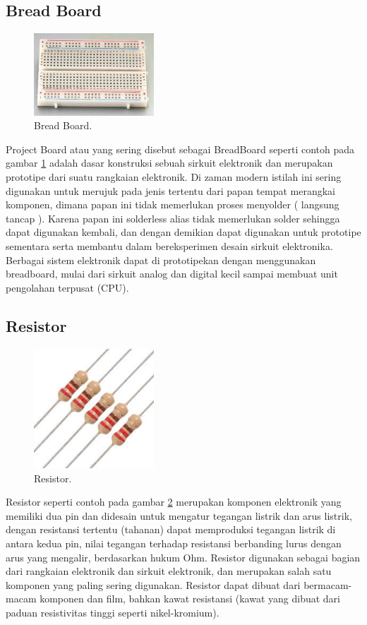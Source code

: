 \subsection{Bread Board}
\begin{figure}[ht]
\centerline{\includegraphics[width=0.4\textwidth]{figures/breadboard.jpg}}
\caption{Bread Board.}
\label{breadboard}
\end{figure}
Project Board atau yang sering disebut sebagai BreadBoard seperti contoh pada gambar \ref{breadboard} adalah dasar konstruksi sebuah sirkuit elektronik dan merupakan prototipe dari suatu rangkaian elektronik. Di zaman modern istilah ini sering digunakan untuk merujuk pada jenis tertentu dari papan tempat merangkai komponen, dimana papan ini tidak memerlukan proses menyolder ( langsung tancap ).
Karena papan ini solderless alias tidak memerlukan solder sehingga dapat digunakan kembali, dan dengan demikian dapat digunakan untuk prototipe sementara serta membantu dalam bereksperimen desain sirkuit elektronika. Berbagai sistem elektronik dapat di prototipekan dengan menggunakan breadboard, mulai dari sirkuit analog dan digital kecil sampai membuat unit pengolahan terpusat (CPU).

\subsection{Resistor}
\begin{figure}[ht]
\centerline{\includegraphics[width=0.4\textwidth]{figures/resistor.jpg}}
\caption{Resistor.}
\label{resistor}
\end{figure}
Resistor seperti contoh pada gambar \ref{resistor} merupakan komponen elektronik yang memiliki dua pin dan didesain untuk mengatur tegangan listrik dan arus listrik, dengan resistansi tertentu (tahanan) dapat memproduksi tegangan listrik di antara kedua pin, nilai tegangan terhadap resistansi berbanding lurus dengan arus yang mengalir, berdasarkan hukum Ohm.
Resistor digunakan sebagai bagian dari rangkaian elektronik dan sirkuit elektronik, dan merupakan salah satu komponen yang paling sering digunakan. Resistor dapat dibuat dari bermacam-macam komponen dan film, bahkan kawat resistansi (kawat yang dibuat dari paduan resistivitas tinggi seperti nikel-kromium).



